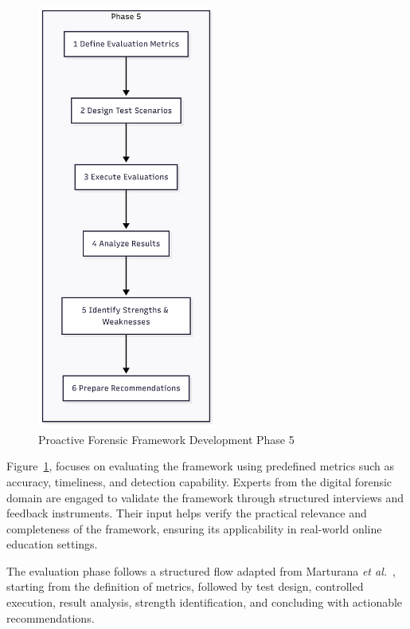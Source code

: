 \begin{figure}[H]
    \centering
    \includegraphics[height=14cm]{figure/framework-development-phase-5.png}
    \caption{Proactive Forensic Framework Development Phase 5}
    \label{fig:framework-development-phase-5}
\end{figure}

Figure~\ref{fig:framework-development-phase-5}, focuses on evaluating the framework using predefined metrics such as accuracy, timeliness, and detection capability. Experts from the digital forensic domain are engaged to validate the framework through structured interviews and feedback instruments. Their input helps verify the practical relevance and completeness of the framework, ensuring its applicability in real-world online education settings.

The evaluation phase follows a structured flow adapted from Marturana \textit{et al.}~\cite{marturana2020evaluation}, starting from the definition of metrics, followed by test design, controlled execution, result analysis, strength identification, and concluding with actionable recommendations.

